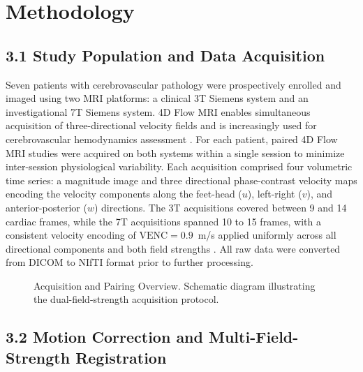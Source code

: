 \documentclass[11pt]{article}
\begin{document}
\section*{Methodology}

\subsection*{3.1 Study Population and Data Acquisition}

Seven patients with cerebrovascular pathology were prospectively enrolled and imaged using two MRI platforms: a clinical 3T Siemens system and an investigational 7T Siemens system. 4D Flow MRI enables simultaneous acquisition of three-directional velocity fields and is increasingly used for cerebrovascular hemodynamics assessment \cite{markl2012,dyverfeldt2015}. For each patient, paired 4D Flow MRI studies were acquired on both systems within a single session to minimize inter-session physiological variability. Each acquisition comprised four volumetric time series: a magnitude image and three directional phase-contrast velocity maps encoding the velocity components along the feet-head ($u$), left-right ($v$), and anterior-posterior ($w$) directions. The 3T acquisitions covered between 9 and 14 cardiac frames, while the 7T acquisitions spanned 10 to 15 frames, with a consistent velocity encoding of $\text{VENC} = 0.9$~m/s applied uniformly across all directional components and both field strengths \cite{bock2010}. All raw data were converted from DICOM to NIfTI format prior to further processing.

\begin{figure}[!htbp]
    \centering
    \caption{Acquisition and Pairing Overview. Schematic diagram illustrating the dual-field-strength acquisition protocol.}
    \label{fig:acquisition}
\end{figure}

\subsection*{3.2 Motion Correction and Multi-Field-Strength Registration}
\end{document}

